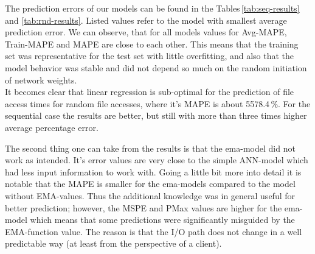 \documentclass{superfri}
\begin{document}
The prediction errors of our models can be found in the Tables\,\ref{tab:seq-results} and \ref{tab:rnd-results}.
Listed values refer to the model with smallest average prediction error.
We can observe, that for all models values for Avg-MAPE, Train-MAPE and MAPE are close to each other.
This means that the training set was representative for the test set with little overfitting, and also that the model behavior was stable and did not depend so much on the random initiation of network weights.
\\
It becomes clear that linear regression is sub-optimal for the prediction of file access times for random file accesses, where it's MAPE is about 5578.4\,\%. For the sequential case the results are better, but still with more than three times higher average percentage error.\medskip

The second thing one can take from the results is that the ema-model did not work as intended.
It's error values are very close to the simple ANN-model which had less input information to work with.
Going a little bit more into detail it is notable that the MAPE is smaller for the ema-models compared to the model without EMA-values.
Thus the additional knowledge was in general useful for better prediction; however, the MSPE and PMax values are higher for the ema-model which means that some predictions were significantly misguided by the EMA-function value.
The reason is that the I/O path does not change in a well predictable way (at least from the perspective of a client).
\medskip
\end{document}
